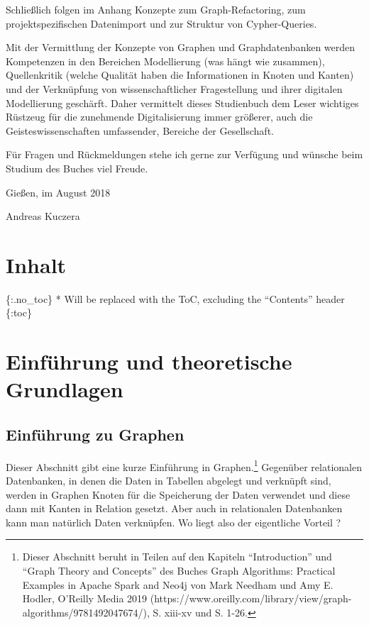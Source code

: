 \documentclass[ngerman,]{scrreprt}
\begin{document}
Schließlich folgen im Anhang Konzepte zum Graph-Refactoring, zum projektspezifischen Datenimport und zur Struktur von Cypher-Queries.

Mit der Vermittlung der Konzepte von Graphen und Graphdatenbanken werden Kompetenzen in den Bereichen Modellierung (was hängt wie zusammen), Quellenkritik (welche Qualität haben die Informationen in Knoten und Kanten) und der Verknüpfung von wissenschaftlicher Fragestellung und ihrer digitalen Modellierung geschärft. Daher vermittelt dieses Studienbuch dem Leser wichtiges Rüstzeug für die zunehmende Digitalisierung immer größerer, auch die Geisteswissenschaften umfassender, Bereiche der Gesellschaft.

Für Fragen und Rückmeldungen stehe ich gerne zur Verfügung und wünsche beim Studium des Buches viel Freude.

Gießen, im August 2018

Andreas Kuczera

\hypertarget{inhalt-1}{%
\chapter{Inhalt}\label{inhalt-1}}

\{:.no\_toc\} * Will be replaced with the ToC, excluding the ``Contents'' header \{:toc\}

\hypertarget{einfuxfchrung-und-theoretische-grundlagen}{%
\chapter{Einführung und theoretische Grundlagen}\label{einfuxfchrung-und-theoretische-grundlagen}}

\hypertarget{einfuxfchrung-zu-graphen}{%
\section{Einführung zu Graphen}\label{einfuxfchrung-zu-graphen}}

Dieser Abschnitt gibt eine kurze Einführung in Graphen.\footnote{Dieser Abschnitt beruht in Teilen auf den Kapiteln ``Introduction'' und ``Graph Theory and Concepts'' des Buches Graph Algorithms: Practical Examples in Apache Spark and Neo4j von Mark Needham und Amy E. Hodler, O'Reilly Media 2019 (https://www.oreilly.com/library/view/graph-algorithms/9781492047674/), S. xiii-xv und S. 1-26.} Gegenüber relationalen Datenbanken, in denen die Daten in Tabellen abgelegt und verknüpft sind, werden in Graphen Knoten für die Speicherung der Daten verwendet und diese dann mit Kanten in Relation gesetzt. Aber auch in relationalen Datenbanken kann man natürlich Daten verknüpfen. Wo liegt also der eigentliche Vorteil ?
\end{document}
